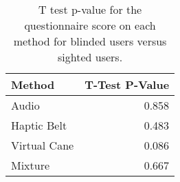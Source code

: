 
\begin{table}[!htb]
\centering
\caption{T test p-value for the questionnaire score on each method for blinded users versus sighted users.}
\label{tab:ttest_questionnaires}
\begin{tabular}{lr}
\toprule
      Method &  T-Test P-Value \\
\midrule
       Audio &           0.858 \\
 Haptic Belt &           0.483 \\
Virtual Cane &           0.086 \\
     Mixture &           0.667 \\
\bottomrule
\end{tabular}
\end{table}

